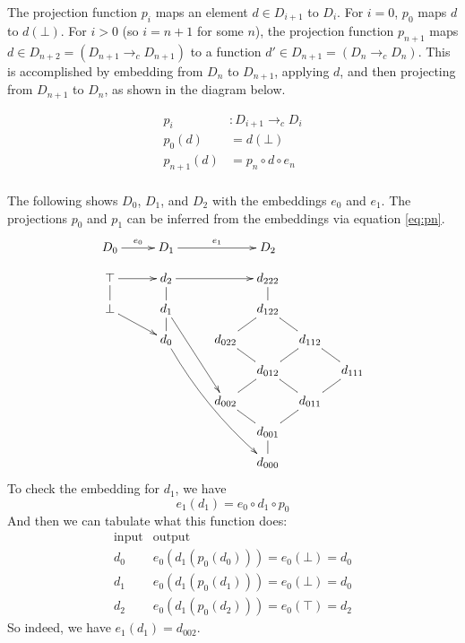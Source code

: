 \documentclass{tufte-handout}
\begin{document}
The projection function $p_i$ maps an element $d \in D_{i+1}$ to
$D_{i}$.  For $i=0$, $p_0$ maps $d$ to $d(\bot)$.  For $i > 0$ (so
$i=n+1$ for some $n$), the projection function $p_{n+1}$ maps $d \in
D_{n+2} = (D_{n+1} \to_c D_{n+1})$ to a function $d' \in D_{n+1} =
(D_n \to_c D_n)$. This is accomplished by embedding from $D_n$ to
$D_{n+1}$, applying $d$, and then projecting from $D_{n+1}$ to $D_n$,
as shown in the diagram below.
\begin{center}
\begin{minipage}{0.5\textwidth}
\begin{align*}
  p_i &: D_{i+1} \to_c D_i  \\
  p_0(d) &= d(\bot) \\
  p_{n+1}(d) &= p_n \circ d \circ e_n\\
\end{align*}
\end{minipage}
\begin{minipage}{0.5\textwidth}
\end{minipage} 
\end{center}

The following shows $D_0$, $D_1$, and $D_2$ with the embeddings $e_0$
and $e_1$. The projections $p_0$ and $p_1$ can be inferred from the
embeddings via equation \eqref{eq:pn}.
\[
\xymatrix@=10pt{
  D_0 \ar[rr]^{e_0}&& D_1 \ar[rrr]^{e_1}& & & D_2 \\
     \top \ar@{-}[d] \ar[rr]&& d_2 \ar@{-}[d] \ar[rrr] &&     & d_{222} \ar@{-}[d]\\
     \bot \ar[drr]&& d_1 \ar@{-}[d] \ar[rrddd] &  &   & d_{122} \ar@{-}[dl] \ar@{-}[dr]\\
     && d_0 \ar@/_/[rrrdddd] && d_{022} \ar@{-}[dr]&     & d_{112} \ar@{-}[dl] \ar@{-}[dr]\\
     && &  &   & d_{012} \ar@{-}[dl]\ar@{-}[dr]&      & d_{111} \ar@{-}[dl]\\
     && & &d_{002} \ar@{-}[dr]&     & d_{011} \ar@{-}[dl]\\
     && & &    & d_{001} \ar@{-}[d]\\
     && & &    & d_{000} 
    } 
\]
To check the embedding for $d_1$, we have
\[
  e_1(d_1) = e_0 \circ d_1 \circ p_0
\]
And then we can tabulate what this function does:
\[
\begin{array}{cc}
  \text{input} & \text{output} \\
  d_0 & e_0(d_1(p_0(d_0))) = e_0(\bot) = d_0 \\
  d_1 & e_0(d_1(p_0(d_1))) = e_0(\bot) = d_0 \\
  d_2 & e_0(d_1(p_0(d_2))) = e_0(\top) = d_2
\end{array}
\]
So indeed, we have $e_1(d_1) = d_{002}$.
\end{document}
